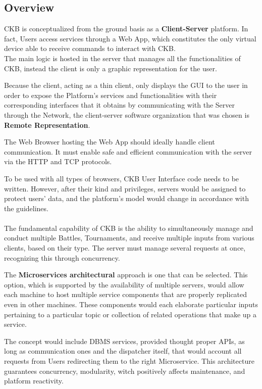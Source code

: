 \subsection{Overview}
CKB is conceptualized from the ground basis as a \textbf{Client-Server} platform. In fact, Users access services through a Web App, which constitutes the only virtual device able to receive commands to interact 
with CKB.
\\
The main logic is hosted in the server that manages all the functionalities of CKB, instead the client is only a graphic representation for the user.

Because the client, acting as a thin client, only displays the GUI to the user in order to expose the Platform's services and functionalities with their corresponding interfaces that it obtains by communicating with the Server through 
the Network, the client-server software organization that was chosen is \textbf{Remote Representation}.

The Web Browser hosting the Web App should ideally handle client communication. It must enable safe and efficient communication with the server via the HTTP and TCP protocols. 

To be used with all types of browsers, CKB User Interface code needs to be written. However, after their kind and privileges, servers would be assigned to protect users' data, and the platform's model would change in accordance 
with the guidelines.\\
\\
The fundamental capability of CKB is the ability to simultaneously manage and conduct multiple Battles, Tournaments, and receive multiple inputs from various clients, based on their type. 
The server must manage several requests at once, recognizing this through concurrency.

The \textbf{Microservices architectural} approach is one that can be selected. This option, which is supported by the availability of multiple servers, would allow each machine to host multiple service components that are properly 
replicated even in other machines. These components would each elaborate particular inputs pertaining to a particular topic or collection of related operations that make up a service.

The concept would include DBMS services, provided thought proper APIs, as long as communication ones and the dispatcher itself, that would account all requests from Users redirecting them to the 
right Microservice. This architecture guarantees concurrency, modularity, witch positively affects maintenance, and platform reactivity.

